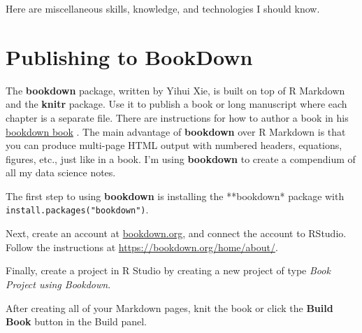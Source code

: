 \documentclass[]{book}
\begin{document}
Here are miscellaneous skills, knowledge, and technologies I should know.

\hypertarget{publishing-to-bookdown}{%
\chapter*{Publishing to BookDown}\label{publishing-to-bookdown}}

The \textbf{bookdown} package, written by Yihui Xie, is built on top of R Markdown and the \textbf{knitr} package. Use it to publish a book or long manuscript where each chapter is a separate file. There are instructions for how to author a book in his \href{https://bookdown.org/yihui/bookdown/}{bookdown book} \citep{xie2019}. The main advantage of \textbf{bookdown} over R Markdown is that you can produce multi-page HTML output with numbered headers, equations, figures, etc., just like in a book. I'm using \textbf{bookdown} to create a compendium of all my data science notes.

The first step to using \textbf{bookdown} is installing the **bookdown* package with \texttt{install.packages("bookdown")}.

Next, create an account at \href{http://bookdown.org}{bookdown.org}, and connect the account to RStudio. Follow the instructions at \url{https://bookdown.org/home/about/}.

Finally, create a project in R Studio by creating a new project of type \emph{Book Project using Bookdown}.

After creating all of your Markdown pages, knit the book or click the \textbf{Build Book} button in the Build panel.


\end{document}
